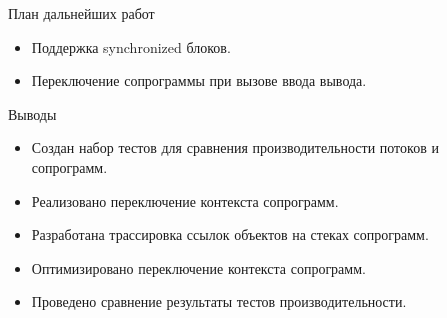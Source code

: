 \begin{frame}{План дальнейших работ} 
	\begin{itemize}
		\item Поддержка synchronized блоков.
		\item Переключение сопрограммы при вызове ввода вывода.
	\end{itemize}
\end{frame}

\begin{frame}{Выводы}
	\begin{itemize}
		\item Создан набор тестов для сравнения производительности потоков и сопрограмм.
		\item Реализовано переключение контекста сопрограмм.
		\item Разработана трассировка ссылок объектов на стеках сопрограмм.
		\item Оптимизировано переключение контекста сопрограмм.
		\item Проведено сравнение результаты тестов производительности.
	\end{itemize}
\end{frame}

